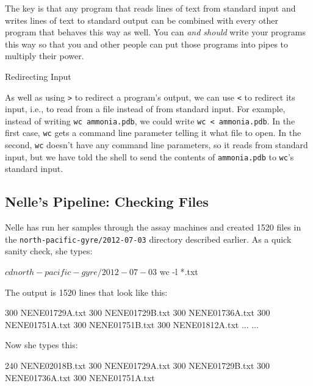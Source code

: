 The key is that any program that reads lines of text from standard input
and writes lines of text to standard output can be combined with every
other program that behaves this way as well. You can \emph{and should}
write your programs this way so that you and other people can put those
programs into pipes to multiply their power.

\begin{swcbox}{Redirecting Input}

As well as using \texttt{\textgreater{}} to redirect a program's output,
we can use \texttt{\textless{}} to redirect its input, i.e., to read
from a file instead of from standard input. For example, instead of
writing \texttt{wc ammonia.pdb}, we could write
\texttt{wc \textless{} ammonia.pdb}. In the first case, \texttt{wc} gets
a command line parameter telling it what file to open. In the second,
\texttt{wc} doesn't have any command line parameters, so it reads from
standard input, but we have told the shell to send the contents of
\texttt{ammonia.pdb} to \texttt{wc}'s standard input.

\end{swcbox}

\subsection*{Nelle's Pipeline: Checking Files}

Nelle has run her samples through the assay machines and created 1520
files in the \texttt{north-pacific-gyre/2012-07-03} directory described
earlier. As a quick sanity check, she types:

\begin{VerbIn}
$ cd north-pacific-gyre/2012-07-03
$ wc -l *.txt
\end{VerbIn}

The output is 1520 lines that look like this:

\begin{VerbOut}
300 NENE01729A.txt
300 NENE01729B.txt
300 NENE01736A.txt
300 NENE01751A.txt
300 NENE01751B.txt
300 NENE01812A.txt
... ...
\end{VerbOut}

Now she types this:


\begin{VerbOut}
 240 NENE02018B.txt
 300 NENE01729A.txt
 300 NENE01729B.txt
 300 NENE01736A.txt
 300 NENE01751A.txt
\end{VerbOut}

